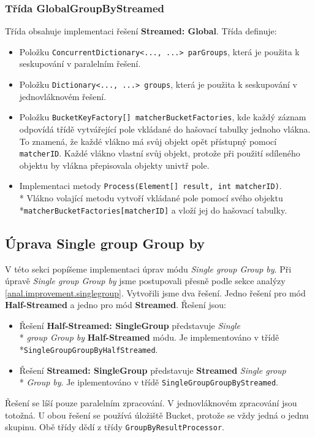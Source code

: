 \subsubsection{Třída GlobalGroupByStreamed}

Třída obsahuje implementaci řešení \textbf{Streamed: Global}.
Třída definuje:
\begin{itemize}
\item Položku \texttt{ConcurrentDictionary<..., ...> parGroups}, která je použita k seskupování v paralelním řešení.
\item Položku \texttt{Dictionary<..., ...> groups}, která je použita k seskupování v jednovláknovém řešení.
\item Položku \texttt{BucketKeyFactory[] matcherBucketFactories}, kde každý záznam odpovídá třídě vytvářející pole vkládané do hašovací tabulky jednoho vlákna.
To znamená, že každé vlákno má svůj objekt opět přístupný pomocí \texttt{matcherID}.
Každé vlákno vlastní svůj objekt, protože při použití sdíleného objektu by vlákna přepisovala objekty univtř pole.
\item Implementaci metody \texttt{Process(Element[] result, int matcherID)}.\\*
Vlákno volající metodu vytvoří vkládané pole pomocí svého objektu \\*\texttt{matcherBucketFactories[matcherID]} a vloží jej do hašovací tabulky.
\end{itemize}

\subsection{Úprava Single group Group by}

V této sekci popíšeme implementaci úprav módu \textit{Single group Group by}.
Při úpravě \textit{Single group Group by} jsme postupovali přesně podle sekce analýzy \ref{anal.improvement.singlegroup}.
Vytvořili jsme dva řešení.
Jedno řešení pro mód \textbf{Half-Streamed} a jedno pro mód \textbf{Streamed}.
Řešení jsou:
\begin{itemize}
\item Řešení \textbf{Half-Streamed: SingleGroup} představuje \textit{Single}\\* \textit{group Group by} \textbf{Half-Streamed} módu.
Je implementováno v třídě \\*\texttt{SingleGroupGroupByHalfStreamed}.
\item Řešení \textbf{Streamed: SingleGroup} představuje \textbf{Streamed} \textit{Single group}\\* \textit{Group by}.
Je iplementováno v třídě \texttt{SingleGroupGroupByStreamed}.
\end{itemize}
Řešení se líší pouze paralelním zpracování. 
V jednovláknovém zpracování jsou totožná.
U obou řešení se používá úložiště Bucket, protože se vždy jedná o jednu skupinu.
Obě třídy dědí z třídy \texttt{GroupByResultProcessor}.

